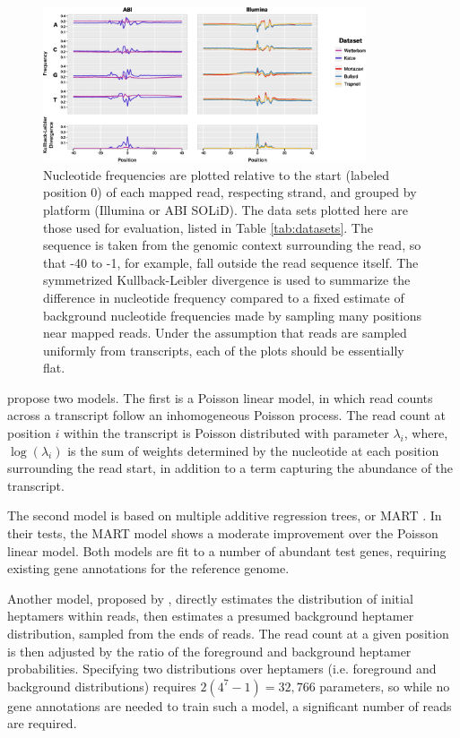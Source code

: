 \documentclass{bioinfo}
\begin{document}
\begin{figure}
\centerline{\includegraphics[width=0.85\textwidth]{freqs.eps}}
\caption{Nucleotide frequencies are plotted relative to the start (labeled
position 0) of each mapped read, respecting strand, and grouped by platform
(Illumina or ABI SOLiD).  The data sets plotted here are those used
for evaluation, listed in Table \ref{tab:datasets}.
The sequence is taken from the genomic context surrounding the read, so that -40
to -1, for example, fall outside the read sequence itself. The symmetrized
Kullback-Leibler divergence is used to summarize the difference in nucleotide
frequency compared to a fixed estimate of background nucleotide frequencies made
by sampling many positions near mapped reads.  Under the assumption that reads
are sampled uniformly from transcripts, each of the plots should be essentially
flat.}
\label{fig:freqs}
\end{figure}

\citet{Li2010} propose two models. The first is a Poisson linear
model, in which read counts across a transcript follow an inhomogeneous Poisson
process. The read count at position $i$ within the transcript is Poisson
distributed with parameter $\lambda_i$, where, $\log(\lambda_i)$ is the sum of
weights determined by the nucleotide at each position surrounding the read
start, in addition to a term capturing the abundance of the transcript.

The second model is based on multiple additive regression trees, or MART
\citep{Friedman2003}.  In their tests, the MART model shows a moderate
improvement over the Poisson linear model. Both models are fit to a number of
abundant test genes, requiring existing gene annotations for the reference
genome. 

Another model, proposed by \citet{Hansen2010}, directly estimates the
distribution of initial heptamers within reads, then estimates a presumed
background heptamer distribution, sampled from the ends of reads. The read count
at a given position is then adjusted by the ratio of the foreground and
background heptamer probabilities. Specifying two distributions over heptamers
(i.e. foreground and background distributions) requires \mbox{$2(4^7-1) =
32,766$}
parameters, so while no gene annotations are needed to train such a model, a
significant number of reads are required.
\end{document}
